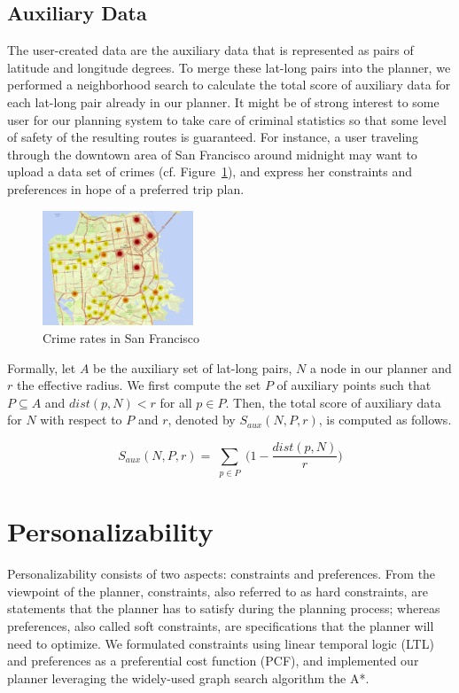 \documentclass[letterpaper]{article}
\newcommand{\aux}{\mathit{aux}}
\newcommand{\dist}{\mathit{dist}}
\newcommand{\figref}[1]{Figure~\ref{fig:#1}}
\begin{document}
\subsection{Auxiliary Data}
The user-created data are the auxiliary data that is represented as pairs
of latitude and longitude degrees.
To merge these lat-long pairs into the planner, we performed a neighborhood
search to calculate the total score of auxiliary data for each 
lat-long pair already in our planner.
It might be of strong interest to some user for our planning
system to take care of criminal statistics so that some level of safety
of the resulting routes is guaranteed.
For instance, a user traveling through the downtown area of San Francisco
around midnight may want to upload a data set of crimes (cf. \figref{sf_crime}), 
and express her constraints and preferences in hope of a preferred trip plan.

\begin{figure}[!ht]
  \centering
    \includegraphics[width=0.4\textwidth]{figs/sub_sf_crime_July2015.png}
  \caption{Crime rates in San Francisco\label{fig:sf_crime}}
\end{figure}

Formally, let $A$ be the auxiliary set of lat-long pairs, 
$N$ a node in our planner and $r$ the effective radius.
We first compute the set $P$ of auxiliary points such that
$P \subseteq A$ and $\dist(p,N)<r$ for all $p \in P$.
Then, the total score of auxiliary data for $N$ with respect to $P$ and $r$,
denoted by $S_\aux(N,P,r)$, is computed as follows.

\begin{equation}
	S_\aux(N,P,r) = \sum_{\substack{p \in P}} \Big(1 - \frac{\dist(p,N)}{r}\Big)
\end{equation}


\section{Personalizability}
Personalizability consists of two aspects: constraints and preferences.
From the viewpoint of the planner,
constraints, also referred to as hard constraints, are statements that the planner
has to satisfy during the planning process; whereas preferences, also called
soft constraints, are specifications that the planner will need to optimize.
We formulated constraints using linear temporal logic (LTL) and preferences as
a preferential cost function (PCF), and implemented our planner leveraging the
widely-used graph search algorithm the A*.
\end{document}

